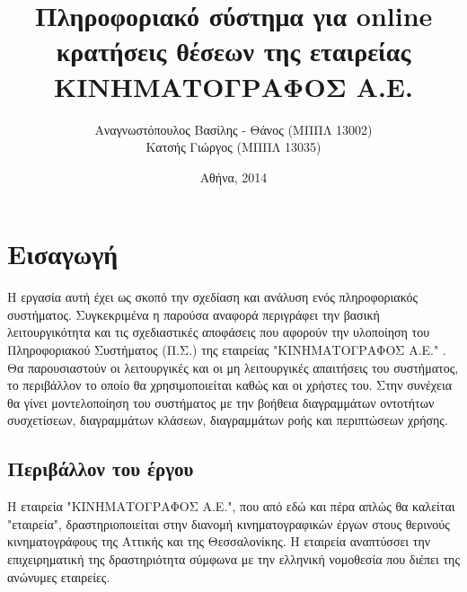 \documentclass{assignment}
\title{Πληροφοριακό σύστημα για online κρατήσεις θέσεων της εταιρείας ΚΙΝΗΜΑΤΟΓΡΑΦΟΣ Α.Ε.}
\date{Αθήνα, 2014}
\author{Αναγνωστόπουλος Βασίλης - Θάνος (ΜΠΠΛ 13002) \\ Κατσής Γιώργος (ΜΠΠΛ 13035)}
\begin{document}
\maketitle

\setcounter{page}{1} 

\pagestyle{plain}
\tableofcontents
\listoffigures
\newpage

\setcounter{page}{1} 

\section{Εισαγωγή}

Η εργασία αυτή έχει ως σκοπό την σχεδίαση και ανάλυση ενός πληροφοριακός συστήματος. Συγκεκριμένα η παρούσα αναφορά περιγράφει την βασική λειτουργικότητα και τις σχεδιαστικές αποφάσεις που αφορούν την υλοποίηση του Πληροφοριακού Συστήματος (Π.Σ.) της εταιρείας "ΚΙΝΗΜΑΤΟΓΡΑΦΟΣ Α.Ε." . Θα παρουσιαστούν οι λειτουργικές και οι μη λειτουργικές απαιτήσεις του συστήματος, το περιβάλλον το οποίο θα χρησιμοποιείται καθώς και οι χρήστες του. Στην συνέχεια θα γίνει μοντελοποίηση του συστήματος με την βοήθεια διαγραμμάτων οντοτήτων συσχετίσεων, διαγραμμάτων κλάσεων, διαγραμμάτων ροής και περιπτώσεων χρήσης.

\subsection{Περιβάλλον του έργου}



Η εταιρεία "ΚΙΝΗΜΑΤΟΓΡΑΦΟΣ Α.Ε.", που από εδώ και πέρα απλώς θα καλείται "εταιρεία", δραστηριοποιείται στην διανομή κινηματογραφικών έργων στους θερινούς κινηματογράφους της Αττικής και της Θεσσαλονίκης. Η εταιρεία αναπτύσσει την επιχειρηματική της δραστηριότητα σύμφωνα με την ελληνική νομοθεσία που διέπει της ανώνυμες εταιρείες.
\end{document}
